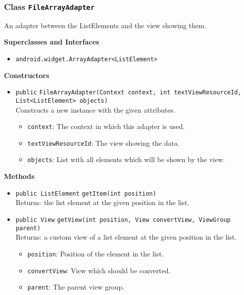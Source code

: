 \subsubsection{Class \lstinline|FileArrayAdapter|}
An adapter between the ListElements and the view showing them. \\



\textbf{Superclasses and Interfaces}
\begin{itemize}
\item \lstinline|android.widget.ArrayAdapter<ListElement>|
\end{itemize}



\textbf{Constructors}
\begin{itemize}
\item \lstinline|public| \lstinline|FileArrayAdapter|\lstinline|(Context context, int textViewResourceId, List<ListElement> objects)|\\
Constructs a new instance with the given attributes.
\begin{itemize}
\item \lstinline|context|: The context in which this adapter is used.
\item \lstinline|textViewResourceId|: The view showing the data.
\item \lstinline|objects|: List with all elements which will be shown by the view.
\end{itemize}



\end{itemize}


\textbf{Methods}
\begin{itemize}
\item \lstinline|public ListElement| \lstinline|getItem|\lstinline|(int position)|\\
Returns: the list element at the given position in the list.



\item \lstinline|public View| \lstinline|getView|\lstinline|(int position, View convertView, ViewGroup parent)|\\
Returns: a custom view of a list element at the given position in the list.
\begin{itemize}
\item \lstinline|position|: Position of the element in the list.
\item \lstinline|convertView|: View which should be converted.
\item \lstinline|parent|: The parent view group.
\end{itemize}



\end{itemize}

